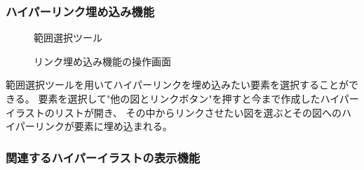 \subsubsection{ハイパーリンク埋め込み機能}

\begin{figure}[H] \begin{minipage}{0.5\hsize}
                         \begin{center} 
                         \end{center} \caption{範囲選択ツール} \label{fig:addLink1}
\end{minipage} \begin{minipage}{0.5\hsize}
                   \begin{center} 
                   \end{center} \caption{リンク埋め込み機能の操作画面} \label{fig:addLink2}
\end{minipage}
\end{figure}

範囲選択ツールを用いてハイパーリンクを埋め込みたい要素を選択することができる。
要素を選択して"他の図とリンクボタン"を押すと今まで作成したハイパーイラストのリストが開き、
その中からリンクさせたい図を選ぶとその図へのハイパーリンクが要素に埋め込まれる。

\subsubsection{関連するハイパーイラストの表示機能}


